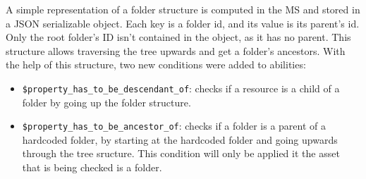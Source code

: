 %
%
%
%
%
%
%
%


A simple representation of a folder structure is computed in the MS
and stored in a JSON serializable object.
Each key is a folder id, and its value is its parent's id.
Only the root folder's ID isn't contained in the object, as it has no parent.
This structure allows traversing the tree upwards and get a folder's ancestors.
With the help of this structure, two new conditions were added to abilities:

\begin{itemize}
  \item \lstinline{$property_has_to_be_descendant_of}: checks if a resource is a child of a
    folder by going up the folder structure.
  \item \lstinline{$property_has_to_be_ancestor_of}: checks if a folder is a parent of
    a hardcoded folder, by starting at the hardcoded folder and going upwards through the
    tree sructure.
    This condition will only be applied it the asset that is being checked is a folder.
\end{itemize}


